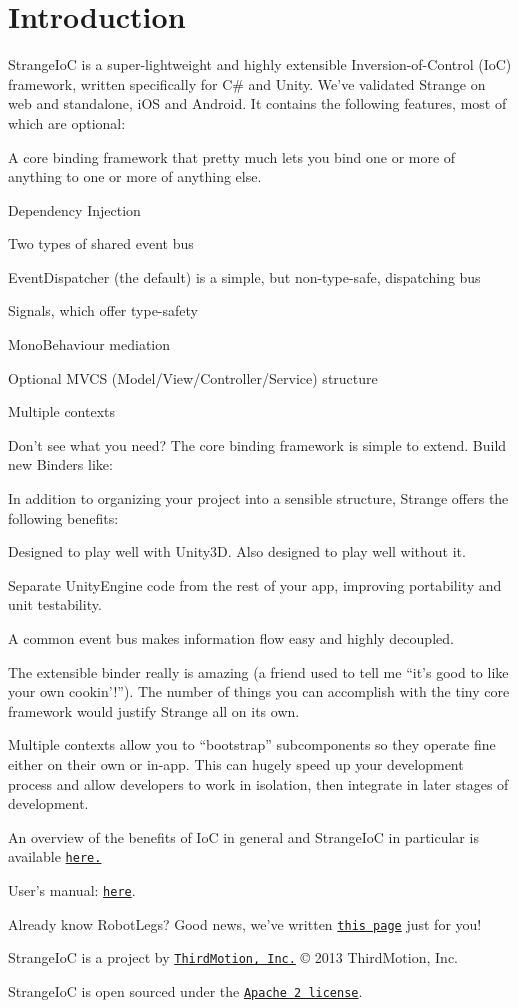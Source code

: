 \hypertarget{index_intro_sec}{}\section{Introduction}\label{index_intro_sec}
Strange\-Io\-C is a super-\/lightweight and highly extensible Inversion-\/of-\/\-Control (Io\-C) framework, written specifically for C\# and Unity. We’ve validated Strange on web and standalone, i\-O\-S and Android. It contains the following features, most of which are optional\-: 
\begin{DoxyItemize}
\item A core binding framework that pretty much lets you bind one or more of anything to one or more of anything else. 
\item Dependency Injection 
\item Two types of shared event bus 
\begin{DoxyItemize}
\item Event\-Dispatcher (the default) is a simple, but non-\/type-\/safe, dispatching bus 
\item Signals, which offer type-\/safety 
\end{DoxyItemize}
\item Mono\-Behaviour mediation 
\item Optional M\-V\-C\-S (Model/\-View/\-Controller/\-Service) structure 
\item Multiple contexts 
\item Don’t see what you need? The core binding framework is simple to extend. Build new Binders like\-: 
\end{DoxyItemize}In addition to organizing your project into a sensible structure, Strange offers the following benefits\-: 
\begin{DoxyItemize}
\item Designed to play well with Unity3\-D. Also designed to play well without it. 
\item Separate Unity\-Engine code from the rest of your app, improving portability and unit testability. 
\item A common event bus makes information flow easy and highly decoupled. 
\item The extensible binder really is amazing (a friend used to tell me “it’s good to like your own cookin’!”). The number of things you can accomplish with the tiny core framework would justify Strange all on its own. 
\item Multiple contexts allow you to “bootstrap” subcomponents so they operate fine either on their own or in-\/app. This can hugely speed up your development process and allow developers to work in isolation, then integrate in later stages of development. 
\end{DoxyItemize}An overview of the benefits of Io\-C in general and Strange\-Io\-C in particular is available \href{../../exec.html}{\tt here.} \par
 User's manual\-: \href{../../TheBigStrangeHowTo.html}{\tt here}. \par
 Already know Robot\-Legs? Good news, we've written \href{../../rl.html}{\tt this page} just for you!

Strange\-Io\-C is a project by \href{http://thirdmotion.com/}{\tt Third\-Motion, Inc.} \copyright{} 2013 Third\-Motion, Inc.

Strange\-Io\-C is open sourced under the \href{http://www.apache.org/licenses/LICENSE-2.0.html}{\tt Apache 2 license}. 